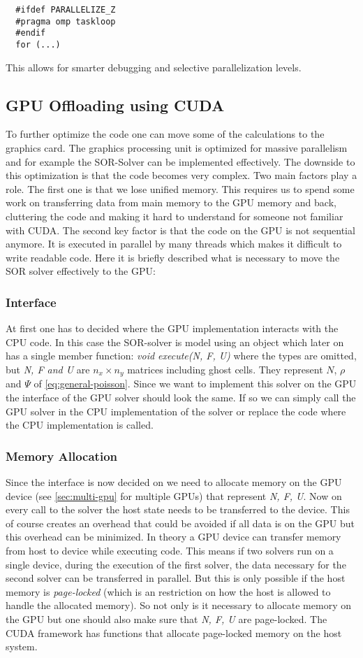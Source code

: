 \documentclass[master.tex]{subfiles}
\begin{document}
\begin{lstlisting}
  #ifdef PARALLELIZE_Z
  #pragma omp taskloop
  #endif
  for (...)
\end{lstlisting}
This allows for smarter debugging and selective parallelization levels.

\subsection{GPU Offloading using CUDA}
To further optimize the code one can move some of the calculations to the graphics card. The graphics processing unit is optimized for massive parallelism and for example the SOR-Solver can be implemented effectively. The downside to this optimization is that the code becomes very complex. Two main factors play a role. The first one is that we lose unified memory. This requires us to spend some work on transferring data from main memory to the GPU memory and back, cluttering the code and making it hard to understand for someone not familiar with CUDA. The second key factor is that the code on the GPU is not sequential anymore. It is executed in parallel by many threads which makes it difficult to write readable code.\newline
Here it is briefly described what is necessary to move the SOR solver effectively to the GPU:
\subsubsection{Interface}
At first one has to decided where the GPU implementation interacts with the CPU code. In this case the \ac{SOR}-solver is model using an object which later on has a single member function: \textit{void execute(N, F, U)} where the types are omitted, but \textit{N, F and U} are $n_x \times n_y$ matrices including ghost cells. They represent $N$, $\rho$ and $\Psi$ of \autoref{eq:general-poisson}. Since we want to implement this solver on the GPU the interface of the GPU solver should look the same. If so we can simply call the GPU solver in the CPU implementation of the solver or replace the code where the CPU implementation is called.
\subsubsection{Memory Allocation}
Since the interface is now decided on we need to allocate memory on the GPU device (see \autoref{sec:multi-gpu} for multiple GPUs) that represent \textit{N, F, U}. Now on every call to the solver the host state needs to be transferred to the device. This of course creates an overhead that could be avoided if all data is on the GPU but this overhead can be minimized. In theory a GPU device can transfer memory from host to device while executing code. This means if two solvers run on a single device, during the execution of the first solver, the data necessary for the second solver can be transferred in parallel. But this is only possible if the host memory is \textit{page-locked} (which is an restriction on how the host is allowed to handle the allocated memory). So not only is it necessary to allocate memory on the GPU but one should also make sure that \textit{N, F, U} are page-locked. The CUDA framework has functions that allocate page-locked memory on the host system.
\end{document}
